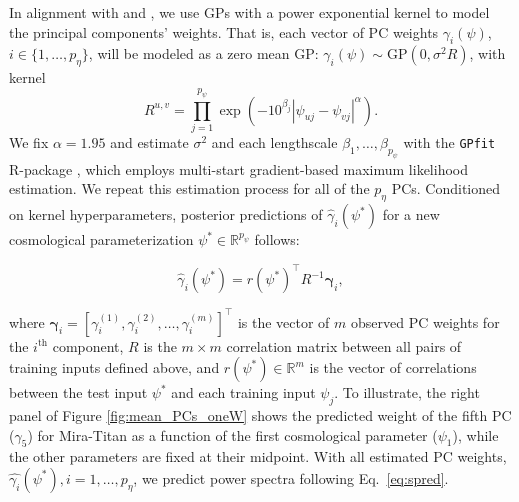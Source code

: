 \documentclass[11pt]{article}
\begin{document}

In alignment with \cite{higdon2010estcosmo} and \cite{moran2023mira}, we use 
GPs with a power exponential kernel to model the principal components' weights. 
That is, each vector of PC weights $\gamma_i(\psi)$, $i \in \{1,\ldots,p_\eta\}$, 
will be modeled as a zero mean GP: $\gamma_i(\psi) \sim \mathrm{GP}(0, \sigma^2R)$, with kernel
\begin{equation*}
    R^{u,v} = \prod_{j=1}^{p_\psi}\exp\left(-10^{\beta_j}|\psi_{uj}-\psi_{vj}|^\alpha\right).
\end{equation*}
We fix $\alpha=1.95$ and estimate $\sigma^2$ and each lengthscale $\beta_1,\ldots,\beta_{p_\psi}$ 
with the \texttt{GPfit} {\sf R}-package \citep{macdonald2015gpfit}, which employs multi-start 
gradient-based maximum likelihood estimation.  We repeat this estimation
process for all of the $p_\eta$ PCs.  Conditioned on kernel hyperparameters,
posterior predictions of $\hat{\gamma}_i(\psi^*)$ for a new cosmological parameterization 
$\psi^* \in \mathbb{R}^{p_\psi}$ follows:

\begin{equation*}
\hat{\gamma}_i(\psi^*) = r(\psi^*)^\top R^{-1} \boldsymbol{\gamma}_i,
\end{equation*}

where $\boldsymbol{\gamma}_i = [\gamma_i^{(1)}, \gamma_i^{(2)}, \ldots, \gamma_i^{(m)}]^\top$ 
is the vector of $m$ observed PC weights for the $i^\textrm{th}$ component, 
$R$ is the $m \times m$ correlation matrix between 
all pairs of training inputs defined above, and $r(\psi^*) \in \mathbb{R}^m$ is 
the vector of correlations between the test input $\psi^*$ and each training input 
$\psi_j$. To illustrate, the right panel of Figure \ref{fig:mean_PCs_oneW} shows
the predicted weight of the fifth PC ($\gamma_5$) for Mira-Titan as a function 
of the first cosmological parameter ($\psi_1$), while the other parameters are fixed 
at their midpoint.  With all estimated PC weights, $\hat{\gamma_i}(\psi^*), i=1,\ldots,p_\eta$, 
we predict power spectra following Eq.~\ref{eq:spred}.  
\end{document}
